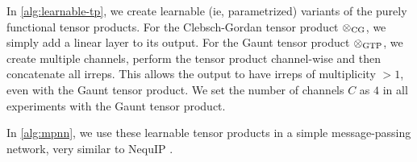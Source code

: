 
In \autoref{alg:learnable-tp}, we create learnable (ie, parametrized) variants of the purely functional tensor products. For the Clebsch-Gordan tensor product $\otimes_{\mathrm{CG}}$, we simply add a linear layer to its output. For the Gaunt tensor product $\otimes_{\mathrm{GTP}}$, we create multiple channels, perform the tensor product channel-wise and then concatenate all irreps. This allows the output to have irreps of multiplicity $> 1$, even with the Gaunt tensor product. We set the number of channels $C$ as $4$ in all experiments with the Gaunt tensor product.

In \autoref{alg:mpnn}, we use these learnable tensor products in a simple message-passing network, very similar to NequIP \citep{nequip}.

